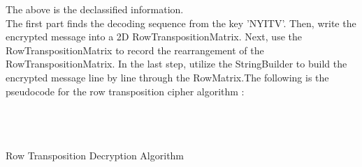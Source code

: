 \documentclass[twoside,twocolumn]{article}
\begin{document}
The above is the declassified information. \\

The first part finds the decoding sequence from the key 'NYITV'. Then, write the encrypted message into a 2D RowTranspositionMatrix. Next, use the RowTranspositionMatrix to record the rearrangement of the RowTranspositionMatrix. In the last step, utilize the StringBuilder to build the encrypted message line by line through the RowMatrix.The following is the pseudocode for the row transposition cipher algorithm : \\ \\ \\ \\

\vspace*{-1.5cm}

 {\footnotesize Row Transposition Decryption Algorithm}
\renewcommand {\algorithmicrequire}{\textbf{input:}}
\renewcommand{\algorithmicensure}{\textbf{output:}}
\end{document}
